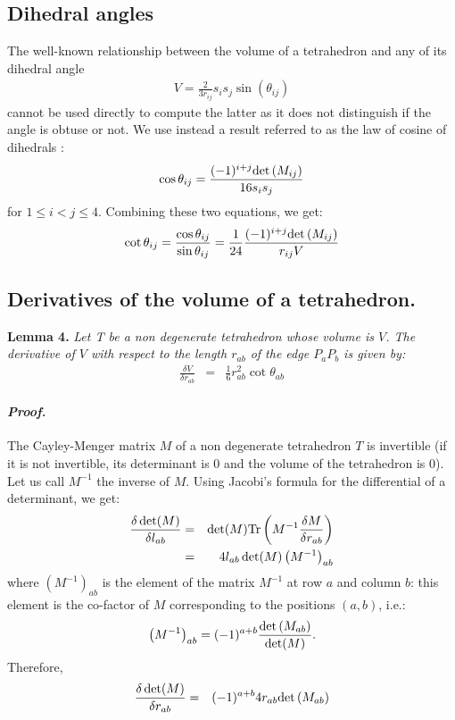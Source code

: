 \documentclass[11 pt]{article}
\newcommand {\mm}[1] {\ifmmode{#1}\else{\mbox{\(#1\)}}\fi}
\theoremstyle{plain} \theorembodyfont{\rmfamily}
\newcommand{\Deter}[1]       {\mm{\rm det\,}{#1}}
\newcommand{\Trace}[1]       {\mm{\rm Tr\,}{#1}}
\begin{document}
 \subsection*{Dihedral angles}
 
The well-known relationship between the volume of a tetrahedron and any of its dihedral angle \cite{Lee97}
 \begin{eqnarray}
 V = \frac{2}{3 r_{ij}} s_i s_j \sin \left( \theta_{ij} \right)
 \label{eqn:volsin}
 \end{eqnarray}
 cannot be used directly to compute the latter as it does not distinguish if the angle is obtuse or not.
 We use instead a result referred to as the law of cosine of dihedrals \cite{Yang89, Yang07}:
\begin{eqnarray}
\cos \theta_{ij}  = \frac{ (-1)^{i+j} \Deter{(M_{ij})}}{ 16s_is_j }
\label{eqn:coslaw}
\end{eqnarray}
for $1 \leq i < j \leq 4$. 
Combining these two equations, we get:
\begin{eqnarray}
\cot \theta_{ij} = \frac{\cos \theta_{ij}}{\sin \theta_{ij}} = \frac{1}{24} \frac{ (-1)^{i+j}  \Deter{(M_{ij})} }{r_{ij}V}
\label{eqn:tetra_ang}
\end{eqnarray}

\subsection*{Derivatives of the volume of a tetrahedron.}
{\bf Lemma 4.} \emph{Let T be a non degenerate tetrahedron whose volume is $V$.  The derivative of $V$ with respect to the length $r_{ab}$ of the edge $P_aP_b$ is given by:}
\begin{eqnarray}
 \frac{\delta V}{\delta r_{ab}} &=& \frac{1}{6} r_{ab}^2 \cot{ \theta_{ab} }
 \label{eqn:tetravol_deriv}
 \end{eqnarray}
 
 \paragraph{\emph{Proof.}} The Cayley-Menger matrix $M$ of a non degenerate tetrahedron $T$ is invertible (if it is not invertible, its determinant is 0 and the volume of the tetrahedron is 0). Let us call $M^{-1}$ the inverse of $M$. Using Jacobi's formula for the differential of a determinant, we get:
 \begin{eqnarray}
 \frac{\delta \det (M)}{\delta l_{ab}} &=& \det (M) \Trace {\left( M^{-1} \frac{\delta M}{\delta r_{ab}} \right)}\nonumber \\
 &=& 4 l_{ab} \det(M) \left(M^{-1}\right)_{ab}
 \end{eqnarray}
 where $\left(M^{-1}\right)_{ab}$ is the element of the matrix $M^{-1}$ at row $a$ and column $b$: this element is the co-factor of $M$ corresponding to the positions $(a,b)$, i.e.:
 \begin{eqnarray}
 \left(M^{-1}\right)_{ab} = (-1)^{a+b} \frac{\Deter{(M_{ab})}}{\det(M)}.
 \end{eqnarray}
 Therefore,
 \begin{eqnarray}
 \frac{\delta \det (M)}{\delta r_{ab}} &=& (-1)^{a+b} 4 r_{ab} \Deter{(M_{ab})}
 \end{eqnarray}
 
\end{document}

